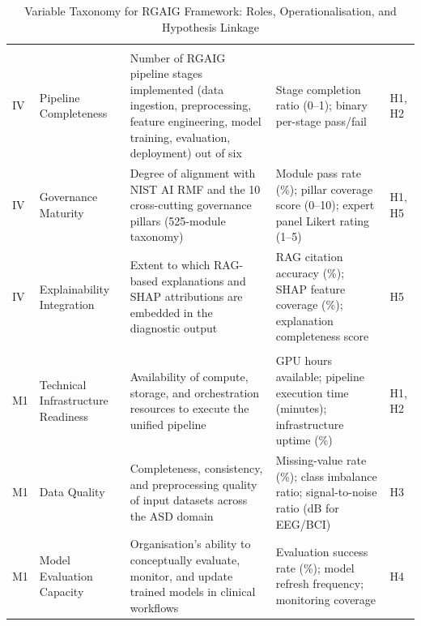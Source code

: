 {\tablestripes\tablefontsize
{}
\begin{xltabular}{\textwidth}{@{} >{\raggedright\arraybackslash}p{1.0cm} >{\raggedright\arraybackslash}p{2.5cm} p{4.9cm} p{4.6cm} >{\raggedright\arraybackslash}p{1.0cm} @{}}
\caption[Variable Taxonomy for RGAIG Framework]{Variable Taxonomy for RGAIG Framework: Roles, Operationalisation, and Hypothesis Linkage}\label{tab:variable_taxonomy} \\
\toprule
{} &  &  &  &  \\
\midrule
\endfirsthead
\endhead
\bottomrule
\endlastfoot
{} \\
\addlinespace
IV & Pipeline Completeness & Number of RGAIG pipeline stages implemented (data ingestion, preprocessing, feature engineering, model training, evaluation, deployment) out of six & Stage completion ratio (0--1); binary per-stage pass/fail & H1, H2 \\
\addlinespace
IV & Governance Maturity & Degree of alignment with NIST AI RMF and the 10 cross-cutting governance pillars (525-module taxonomy) & Module pass rate (\%); pillar coverage score (0--10); expert panel Likert rating (1--5) & H1, H5 \\
\addlinespace
IV & Explainability Integration & Extent to which RAG-based explanations and SHAP attributions are embedded in the diagnostic output & RAG citation accuracy (\%); SHAP feature coverage (\%); explanation completeness score & H5 \\
\midrule
{} \\
\addlinespace
M1 & Technical Infrastructure Readiness & Availability of compute, storage, and orchestration resources to execute the unified pipeline & GPU hours available; pipeline execution time (minutes); infrastructure uptime (\%) & H1, H2 \\
\addlinespace
M1 & Data Quality & Completeness, consistency, and preprocessing quality of input datasets across the ASD domain & Missing-value rate (\%); class imbalance ratio; signal-to-noise ratio (dB for EEG/BCI) & H3 \\
\addlinespace
M1 & Model Evaluation Capacity & Organisation's ability to conceptually evaluate, monitor, and update trained models in clinical workflows & Evaluation success rate (\%); model refresh frequency; monitoring coverage & H4 \\

\end{xltabular}}
